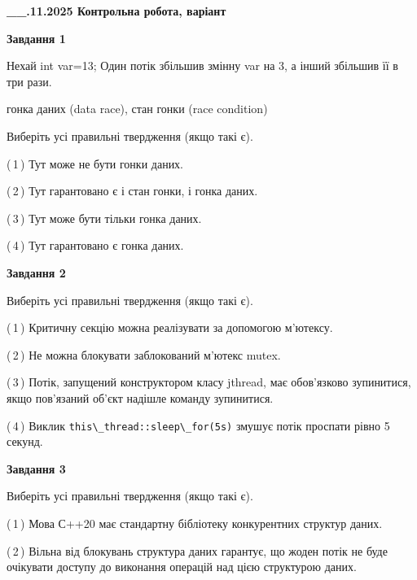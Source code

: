 \documentclass[12pt, ukrainian]{article}
\def\code#1{\Verb!#1!}
\begin{document}
\begin {large}

\textbf{\_\_.11.2025 Контрольна робота, варіант  }\par


{

\begin{center}
\textbf{Завдання 1}
\end{center}
Нехай int var=13; Один потік збільшив змінну var на 3, а інший збільшив її в три рази.

гонка даних (data race), стан гонки (race condition)

Виберіть усі правильні твердження (якщо такі є).\par
\vspace{2mm}
(\,1\,) Тут може не бути гонки даних.%

(\,2\,) Тут гарантовано є і стан гонки, і гонка даних.%

(\,3\,) Тут може бути тільки гонка даних.%

(\,4\,) Тут гарантовано є гонка даних.%



\begin{center}
\textbf{Завдання 2}
\end{center}
Виберіть усі правильні твердження (якщо такі є).\par
\vspace{2mm}

(\,1\,) Критичну секцію можна реалізувати за допомогою м’ютексу.%

(\,2\,) Не можна блокувати заблокований м’ютекс mutex.%

(\,3\,) Потік, запущений конструктором класу jthread, має обов’язково зупинитися, якщо пов’язаний об’єкт надішле команду зупинитися.%

(\,4\,) Виклик \code{this\_thread::sleep\_for(5s)} змушує потік проспати рівно 5 секунд.%



\begin{center}
\textbf{Завдання 3}
\end{center}
Виберіть усі правильні твердження (якщо такі є).\par
\vspace{2mm}

(\,1\,) Мова С++20 має стандартну бібліотеку конкурентних структур даних.%

(\,2\,) Вільна від блокувань структура даних гарантує, що жоден потік не буде очікувати доступу до виконання операцій над цією структурою даних.%

}
\end{large}
\end{document}
